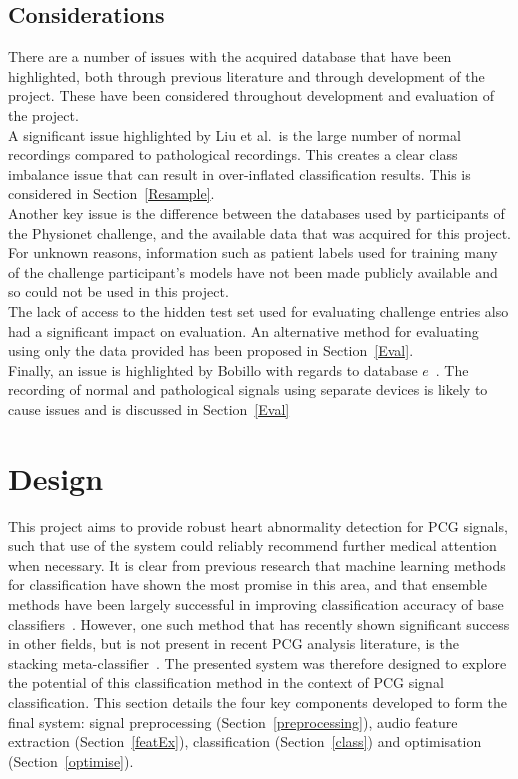 \documentclass[titlepage, 12pt]{scrartcl} \usepackage{enumitem}
\begin{document}
\subsection{Considerations}\label{DBCons}
There are a number of issues with the acquired database that have been
highlighted, both through previous literature and through development of the
project. These have been considered throughout development and evaluation of
the project.\\
A significant issue highlighted by Liu et al.\ is the large number of normal
recordings compared to pathological recordings. This creates a clear class
imbalance issue that can result in over-inflated classification
results. This is considered in
Section~\ref{Resample}.\\
Another key issue is the difference between the databases used by participants of the
Physionet challenge, and the available data that was acquired for this project.
For unknown reasons, information such as patient labels used for training many
of the challenge participant's models have not been made publicly available and
so could not be used in this project.\\
The lack of access to the hidden test set used for evaluating challenge entries
also had a significant impact on evaluation. An alternative method for
evaluating using only the data provided has been proposed in
Section~\ref{Eval}.\\
Finally, an issue is highlighted by Bobillo with regards to database
$e$~\parencite{Bobillo2016}. The recording of normal and pathological signals using
separate devices is likely to cause issues and is discussed in
Section~\ref{Eval}


\section{Design}
This project aims to provide robust heart abnormality detection for PCG
signals, such that use of the system could reliably recommend further medical
attention when necessary. It is clear from previous research that machine
learning methods for classification have shown the most promise in this area,
and that ensemble methods have been largely successful in improving
classification accuracy of base classifiers~\parencite{Homsi2017, Potes2016}.
However, one such method that has recently shown significant success in other
fields, but is not present in recent PCG analysis literature, is the stacking
meta-classifier~\parencite[p.498]{Tobergte2013a}. The presented system was
therefore designed to explore the potential of this classification method in
the context of PCG signal classification. This section details the four key
components developed to form the final system: signal preprocessing
(Section~\ref{preprocessing}), audio feature extraction (Section~\ref{featEx}),
classification (Section~\ref{class}) and optimisation (Section~\ref{optimise}).
\end{document}
